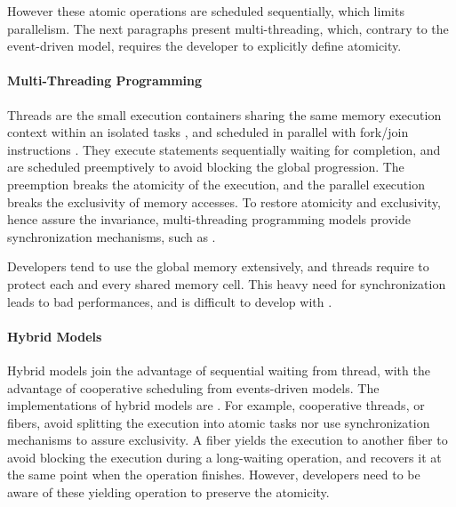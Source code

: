 However these atomic operations are scheduled sequentially, which limits parallelism.
The next paragraphs present multi-threading, which, contrary to the event-driven model, requires the developer to explicitly define atomicity.



\paragraph{Multi-Threading Programming}

Threads are the small execution containers sharing the same memory execution context within an isolated tasks \cite{Dijkstra1968}, and scheduled in parallel with fork/join instructions \cite{Randall1998,Frigo1998,Leiserson2010}.
They execute statements sequentially waiting for completion, and are scheduled preemptively to avoid blocking the global progression.
The preemption breaks the atomicity of the execution, and the parallel execution breaks the exclusivity of memory accesses.
To restore atomicity and exclusivity, hence assure the invariance, multi-threading programming models provide synchronization mechanisms, such as .

Developers tend to use the global memory extensively, and threads require to protect each and every shared memory cell.
This heavy need for synchronization leads to bad performances, and is difficult to develop with \cite{Adya2002}.

\paragraph{Hybrid Models}

Hybrid models join the advantage of sequential waiting from thread, with the advantage of cooperative scheduling from events-driven models.
The implementations of hybrid models are .
For example, cooperative threads, or fibers, avoid splitting the execution into atomic tasks nor use synchronization mechanisms to assure exclusivity.
A fiber yields the execution to another fiber to avoid blocking the execution during a long-waiting operation, and recovers it at the same point when the operation finishes.
However, developers need to be aware of these yielding operation to preserve the atomicity.

